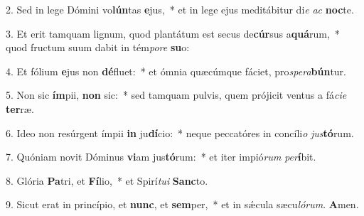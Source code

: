 2. Sed in lege Dómini vo\textbf{lún}tas \textbf{e}jus,~*  et in lege ejus meditábitur di\textit{e} \textit{ac} \textbf{noc}te.\

3. Et erit tamquam lignum, quod plantátum est secus de\textbf{cúr}sus a\textbf{quá}rum,~*  quod fructum suum dabit in tém\textit{po}\textit{re} \textbf{su}o:\

4. Et fólium \textbf{e}jus non \textbf{dé}fluet:~*  et ómnia quæcúmque fáciet, pro\textit{spe}\textit{ra}\textbf{bún}tur.\

5. Non sic \textbf{ím}pii, \textbf{non} sic:~*  sed tamquam pulvis, quem prójicit ventus a fá\textit{ci}\textit{e} \textbf{ter}ræ.\

6. Ideo non resúrgent ímpii \textbf{in} ju\textbf{dí}cio:~*  neque peccatóres in concíli\textit{o} \textit{jus}\textbf{tó}rum.\

7. Quóniam novit Dóminus \textbf{vi}am jus\textbf{tó}rum:~*  et iter impió\textit{rum} \textit{per}\textbf{í}bit.\

8. Glória \textbf{Pa}tri, et \textbf{Fí}lio,~*  et Spirí\textit{tu}\textit{i} \textbf{Sanc}to.\

9. Sicut erat in princípio, et \textbf{nunc}, et \textbf{sem}per,~*  et in sǽcula sæcu\textit{ló}\textit{rum}. \textbf{A}men.\

